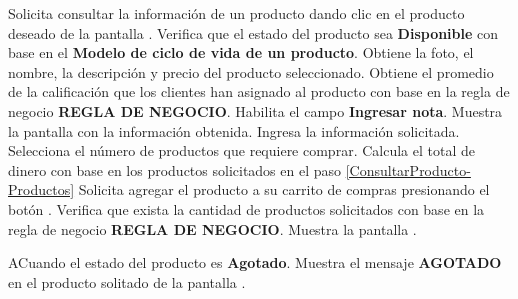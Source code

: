 	
	\begin{UCtrayectoria}
		\UCpaso[\UCactor] Solicita consultar la información de un producto dando clic en el producto deseado de la pantalla .
		\UCpaso Verifica que el estado del producto sea \textbf{Disponible} con base en el \textbf{Modelo de ciclo de vida de un producto}.
		\UCpaso Obtiene la foto, el nombre, la descripción y precio del producto seleccionado.
		\UCpaso Obtiene el promedio de la calificación que los clientes han asignado al producto con base en la regla de negocio \textbf{REGLA DE NEGOCIO}.
		\UCpaso Habilita el campo \textbf{Ingresar nota}.
		\UCpaso Muestra la pantalla  con la información obtenida.
		\UCpaso [\UCactor] Ingresa la información solicitada.
		\UCpaso [\UCactor] \label{ConsultarProducto-Productos} Selecciona el número de productos que requiere comprar.
		\UCpaso Calcula el total de dinero con base en los productos solicitados en el paso \ref{ConsultarProducto-Productos}
		\UCpaso [\UCactor] Solicita agregar el producto a su carrito de compras presionando el botón .
		\UCpaso Verifica que exista la cantidad de productos solicitados con base en la regla de negocio \textbf{REGLA DE NEGOCIO}.
		\UCpaso Muestra la pantalla .
	\end{UCtrayectoria}
	

	\begin{UCtrayectoriaA}{A}{Cuando el estado del producto es \textbf{Agotado}.}
		\UCpaso Muestra el mensaje \textbf{AGOTADO} en el producto solitado de la pantalla .
	
	\end{UCtrayectoriaA}
	